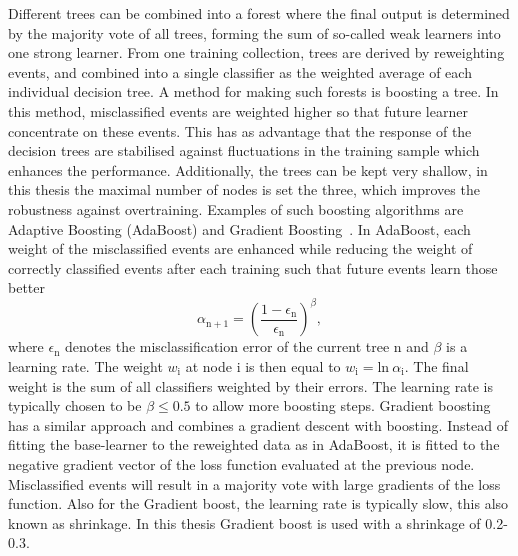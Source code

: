  Different trees can be combined into a forest where the final output is determined by the majority vote of all trees, forming the sum of so-called weak learners into one strong learner.   From one training collection, trees are derived by reweighting events, and combined into a single classifier as the  weighted average of each individual decision tree. A method for  making such forests is  boosting a tree. In this method, misclassified events are weighted higher so that future learner concentrate on these events. This has as advantage that the response of the decision trees are stabilised against fluctuations in the training sample which enhances the performance. Additionally, the trees can be kept very shallow, in this thesis the maximal number of nodes is set the three, which improves the robustness against overtraining. Examples of such boosting algorithms are Adaptive Boosting (AdaBoost) and Gradient Boosting~\cite{2014arXiv1403.1452M}. In AdaBoost, each weight of the misclassified events are enhanced while reducing the weight of correctly classified events after each training such that  future events learn those better
\begin{equation}
 \alpha_{\mathrm{n+1}} = \left(\frac{1-\epsilon_{\mathrm{n}}}{\epsilon_{\mathrm{n}}}\right)^{\beta}, 
\end{equation}
where $\epsilon_{\mathrm{n}}$ denotes the misclassification error of the current tree n and $\beta$ is a learning rate. The weight $w_{\mathrm{i}}$ at node i is then equal to $w_{\mathrm{i}} = \mathrm{ln}\:\alpha_{\mathrm{i}}$. The final weight is the sum of all classifiers weighted by their errors. The learning rate is typically chosen to be $\beta\leqslant 0.5$ to allow more boosting steps. Gradient boosting has a similar approach and combines a gradient descent with boosting. Instead of fitting the base-learner to the reweighted data as in AdaBoost, it is fitted to the negative gradient vector of the loss function evaluated at the previous node. Misclassified events will result in a majority vote with large gradients of the loss function. Also for the Gradient boost, the learning rate is typically slow, this also known as shrinkage. In this thesis Gradient boost is used with a shrinkage of 0.2-0.3.

